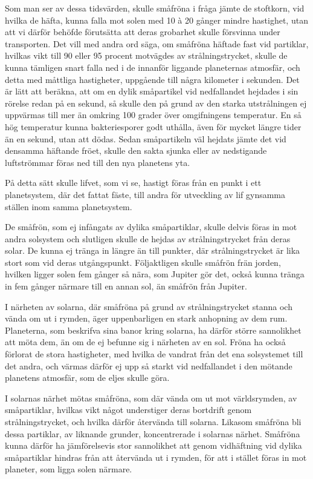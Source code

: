 \documentclass[a4paper, 12pt, oneside, swedish]{article}
\begin{document}
Som man ser av dessa tidsvärden, skulle småfröna i fråga jämte de stoftkorn, vid hvilka de häfta, kunna falla mot solen med 10 à 20 gånger mindre hastighet, utan att vi därför behöfde förutsätta att deras grobarhet skulle försvinna under transporten. Det vill med andra ord säga, om småfröna häftade fast vid partiklar, hvilkas vikt till 90 eller 95 procent motvägdes av strålningstrycket, skulle de kunna tämligen snart falla ned i de innanför liggande planeternas atmosfär, och detta med måttliga hastigheter, uppgående till några kilometer i sekunden. Det är lätt att beräkna, att om en dylik småpartikel vid nedfallandet hejdades i sin rörelse redan på en sekund, så skulle den på grund av den starka utstrålningen ej uppvärmas till mer än omkring 100 grader över omgifningens temperatur. En så hög temperatur kunna bakteriesporer godt uthålla, även för mycket längre tider än en sekund, utan att dödas. Sedan småpartikeln väl hejdats jämte det vid densamma häftande fröet, skulle den sakta sjunka eller av nedstigande luftströmmar föras ned till den nya planetens yta.

På detta sätt skulle lifvet, som vi se, hastigt föras från en punkt i ett planetsystem, där det fattat fäste, till andra för utveckling av lif gynsamma ställen inom samma planetsystem.

De småfrön, som ej infångats av dylika småpartiklar, skulle delvis föras in mot andra solsystem och slutligen skulle de hejdas av strålningstrycket från deras solar. De kunna ej tränga in längre än till punkter, där strålningstrycket är lika stort som vid deras utgångspunkt. Följaktligen skulle småfrön frän jorden, hvilken ligger solen fem gånger så nära, som Jupiter gör det, också kunna tränga in fem gånger närmare till en annan sol, än småfrön från Jupiter.

I närheten av solarna, där småfröna på grund av strålningstrycket stanna och vända om ut i rymden, äger uppenbarligen en stark anhopning av dem rum. Planeterna, som beskrifva sina banor kring solarna, ha därför större sannolikhet att möta dem, än om de ej befunne sig i närheten av en sol. Fröna ha också förlorat de stora hastigheter, med hvilka de vandrat från det ena solsystemet till det andra, och värmas därför ej upp så starkt vid nedfallandet i den mötande planetens atmosfär, som de eljes skulle göra.

I solarnas närhet mötas småfröna, som där vända om ut mot världsrymden, av småpartiklar, hvilkas vikt något understiger deras bortdrift genom strålningstrycket, och hvilka därför återvända till solarna. Likasom småfröna bli dessa partiklar, av liknande grunder, koncentrerade i solarnas närhet. Småfröna kunna därför ha jämförelsevis stor sannolikhet att genom vidhäftning vid dylika småpartiklar hindras från att återvända ut i rymden, för att i stället föras in mot planeter, som ligga solen närmare.
\end{document}
